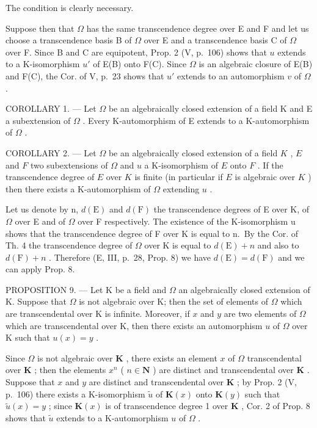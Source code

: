 The condition is clearly necessary.

Suppose then that \(\Omega\) has the same transcendence degree over E and F and let us choose a transcendence basis B of \(\Omega\) over E and a transcendence basis C of \(\Omega\) over F. Since B and C are equipotent, Prop. 2 (V, p.~106) shows that \(u\) extends to a K-isomorphism \(u'\) of E(B) onto F(C). Since \(\Omega\) is an algebraic closure of E(B) and F(C), the Cor. of V, p.~23 shows that \(u'\) extends to an automorphism \(v\) of \(\Omega\) .

COROLLARY 1. --- Let \(\Omega\) be an algebraically closed extension of a field K and E a subextension of \(\Omega\) . Every K-automorphism of E extends to a K-automorphism of \(\Omega\) .

COROLLARY 2. --- Let \(\Omega\) be an algebraically closed extension of a field \(K\) , \(E\) and \(F\) two subextensions of \(\Omega\) and \(u\) a K-isomorphism of \(E\) onto \(F\) . If the transcendence degree of \(E\) over \(K\) is finite (in particular if \(E\) is algebraic over \(K\) ) then there exists a K-automorphism of \(\Omega\) extending \(u\) .

Let us denote by n, \(d(\mathrm{E})\) and \(d(\mathrm{F})\) the transcendence degrees of E over K, of \(\Omega\) over E and of \(\Omega\) over F respectively. The existence of the K-isomorphism u shows that the transcendence degree of F over K is equal to n.~By the Cor. of Th. 4 the transcendence degree of \(\Omega\) over K is equal to \(d(\mathrm{E}) + n\) and also to \(d(\mathrm{F}) + n\) . Therefore (E, III, p.~28, Prop. 8) we have \(d(\mathrm{E}) = d(\mathrm{F})\) and we can apply Prop. 8.

PROPOSITION 9. --- Let K be a field and \(\Omega\) an algebraically closed extension of K. Suppose that \(\Omega\) is not algebraic over K; then the set of elements of \(\Omega\) which are transcendental over K is infinite. Moreover, if \(x\) and \(y\) are two elements of \(\Omega\) which are transcendental over K, then there exists an automorphism \(u\) of \(\Omega\) over K such that \(u(x) = y\) .

Since \(\Omega\) is not algebraic over \(\mathbf{K}\) , there exists an element \(x\) of \(\Omega\) transcendental over \(\mathbf{K}\) ; then the elements \(x^n\) ( \(n \in \mathbf{N}\) ) are distinct and transcendental over \(\mathbf{K}\) . Suppose that \(x\) and \(y\) are distinct and transcendental over \(\mathbf{K}\) ; by Prop. 2 (V, p.~106) there exists a K-isomorphism \(\tilde{u}\) of \(\mathbf{K}(x)\) onto \(\mathbf{K}(y)\) such that \(\tilde{u}(x) = y\) ; since \(\mathbf{K}(x)\) is of transcendence degree 1 over \(\mathbf{K}\) , Cor. 2 of Prop. 8 shows that \(\tilde{u}\) extends to a K-automorphism \(u\) of \(\Omega\) .

